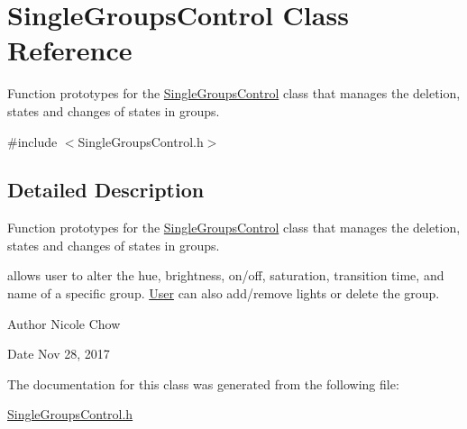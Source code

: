 \hypertarget{classSingleGroupsControl}{}\section{Single\+Groups\+Control Class Reference}
\label{classSingleGroupsControl}


Function prototypes for the \hyperlink{classSingleGroupsControl}{Single\+Groups\+Control} class that manages the deletion, states and changes of states in groups.  




{\ttfamily \#include $<$Single\+Groups\+Control.\+h$>$}



\subsection{Detailed Description}
Function prototypes for the \hyperlink{classSingleGroupsControl}{Single\+Groups\+Control} class that manages the deletion, states and changes of states in groups. 

allows user to alter the hue, brightness, on/off, saturation, transition time, and name of a specific group. \hyperlink{classUser}{User} can also add/remove lights or delete the group.

\begin{DoxyAuthor}{Author}
Nicole Chow 
\end{DoxyAuthor}
\begin{DoxyDate}{Date}
Nov 28, 2017 
\end{DoxyDate}


The documentation for this class was generated from the following file\+:\begin{DoxyCompactItemize}
\item 
\hyperlink{SingleGroupsControl_8h}{Single\+Groups\+Control.\+h}\end{DoxyCompactItemize}
